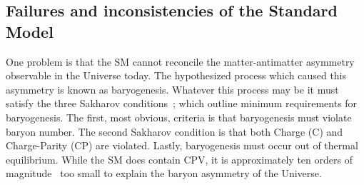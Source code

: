 \subsection{Failures and inconsistencies of the Standard Model}
\label{sec:bsm:fail}
One problem is that the SM cannot reconcile the matter-antimatter asymmetry observable in the
Universe today.
The hypothesized process which caused this asymmetry is known as baryogenesis.
Whatever this process may be it must satisfy the three Sakharov
conditions~\cite{1991SvPhU..34..392S}; which outline minimum requirements for baryogenesis.
The first, most obvious, criteria is that baryogenesis must violate baryon number.
The second Sakharov condition is that both Charge (C) and Charge-Parity (CP) are violated.
Lastly, baryogenesis must occur out of thermal equilibrium.
While the SM does contain CPV, it is approximately ten orders of
magnitude~\cite{Cline:2006ts,Huet:1994jb} too small to explain the baryon asymmetry of the
Universe.

